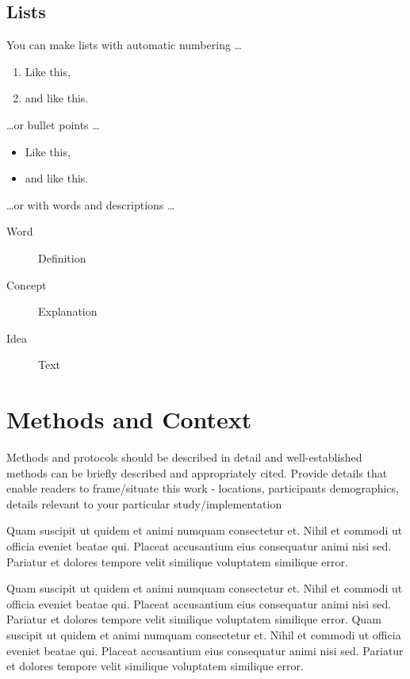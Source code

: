 \documentclass[11pt]{report}
\begin{document}
\subsection{Lists}

You can make lists with automatic numbering \dots

\begin{enumerate}[noitemsep] 
\item Like this,
\item and like this.
\end{enumerate}
\dots or bullet points \dots
\begin{itemize}[noitemsep] 
\item Like this,
\item and like this.
\end{itemize}
\dots or with words and descriptions \dots
\begin{description}
\item[Word] Definition
\item[Concept] Explanation
\item[Idea] Text
\end{description}

\section{Methods and Context}
 Methods and protocols should be described in detail and well-established methods can be briefly described and appropriately cited. Provide details that enable readers to frame/situate this work - locations, participants demographics, details relevant to your particular study/implementation

Quam suscipit ut quidem et animi numquam consectetur et. Nihil et commodi ut officia eveniet beatae qui. Placeat accusantium eius consequatur animi nisi sed. Pariatur et dolores tempore velit similique voluptatem similique error.

Quam suscipit ut quidem et animi numquam consectetur et. Nihil et commodi ut officia eveniet beatae qui. Placeat accusantium eius consequatur animi nisi sed. Pariatur et dolores tempore velit similique voluptatem similique error. Quam suscipit ut quidem et animi numquam consectetur et. Nihil et commodi ut officia eveniet beatae qui. Placeat accusantium eius consequatur animi nisi sed. Pariatur et dolores tempore velit similique voluptatem similique error.
\end{document}
